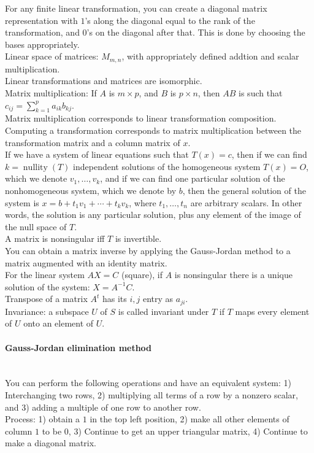 \documentclass[10pt]{article}
\DeclareMathOperator{\nullity}{nullity}
\begin{document}
For any finite linear transformation, you can create a diagonal matrix representation with $1$'s along the diagonal
equal to the rank of the transformation, and $0$'s on the diagonal after that.  This is done by choosing the 
bases appropriately.\\
Linear space of matrices: $M_{m,n}$, with appropriately defined addtion and scalar multiplication.\\
Linear transformations and matrices are isomorphic.\\
Matrix multiplication: If $A$ is $m \times p$, and $B$ is $p \times n$, then $AB$ is such that $c_{ij} = \sum_{k=1}^p a_{ik} b_{kj}$.\\
Matrix multiplication corresponds to linear transformation composition.\\
Computing a transformation corresponds to matrix multiplication between the transformation matrix and a column matrix of $x$.\\
If we have a system of linear equations such that $T(x) = c$, then if we can find $k = \nullity(T)$ independent solutions of the
homogeneous system $T(x) = O$, which we denote $v_1, \dotsc, v_k$, and if we can find one particular solution of the
nonhomogeneous system, which we denote by $b$, then the general solution of the system is 
$x = b + t_1 v_1 + \dotsb + t_k v_k$, where $t_1, \dotsc, t_n$ are arbitrary scalars. In other words, the solution is any
particular solution, plus any element of the image of the null space of $T$.\\
A matrix is nonsingular iff $T$ is invertible.\\
You can obtain a matrix inverse by applying the Gauss-Jordan method to a matrix augmented with an identity matrix.\\
For the linear system $AX = C$ (square), if $A$ is nonsingular there is a unique solution of the system: $X = A^{-1}C$.\\
Transpose of a matrix $A^t$ has its $i, j$ entry as $a_{ji}$.\\
Invariance: a subspace $U$ of $S$ is called invariant under $T$ if $T$ maps every element of $U$ onto an element of $U$.

\paragraph{Gauss-Jordan elimination method}\ \\
You can perform the following operations and have an equivalent system: 1) Interchanging two rows, 2) multiplying all
terms of a row by a nonzero scalar, and 3) adding a multiple of one row to another row.\\
Process: 1) obtain a $1$ in the top left position, 2) make all other elements of column $1$ to be $0$,
3) Continue to get an upper triangular matrix, 4) Continue to make a diagonal matrix.
\end{document}

